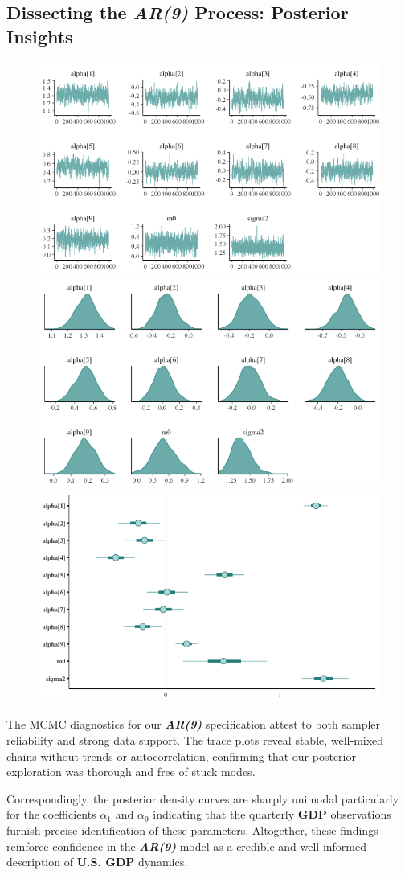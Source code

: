 \documentclass{Configuration_Files/PoliMi3i_thesis}
\begin{document}
\subsection{Dissecting the \textbf{\textit{AR(9)}} Process: Posterior Insights}
\begin{figure}[H]
    \centering
    \includegraphics[width=0.50\linewidth]{GDP_AR(9)_TRACE1.png}
    \vspace{0.5em}
    
    \includegraphics[width=0.50\linewidth]{GDP_AR(9)_DENSITY1.png}
    \vspace{0.5em}
    
    \includegraphics[width=0.50\linewidth]{GDP_AR(9)_INTERVAL1.png}
\end{figure}
The MCMC diagnostics for our \textbf{\textit{AR(9)}} specification attest to both sampler reliability and strong data support. The trace plots reveal stable, well‐mixed chains without trends or autocorrelation, confirming that our posterior exploration was thorough and free of stuck modes. 

Correspondingly, the posterior density curves are sharply unimodal particularly for the coefficients \(\alpha_{1}\) and \(\alpha_{9}\) indicating that the quarterly \textbf{GDP} observations furnish precise identification of these parameters. Altogether, these findings reinforce confidence in the \textbf{\textit{AR(9)}} model as a credible and well‐informed description of \textbf{U.S. GDP} dynamics.
\end{document}
